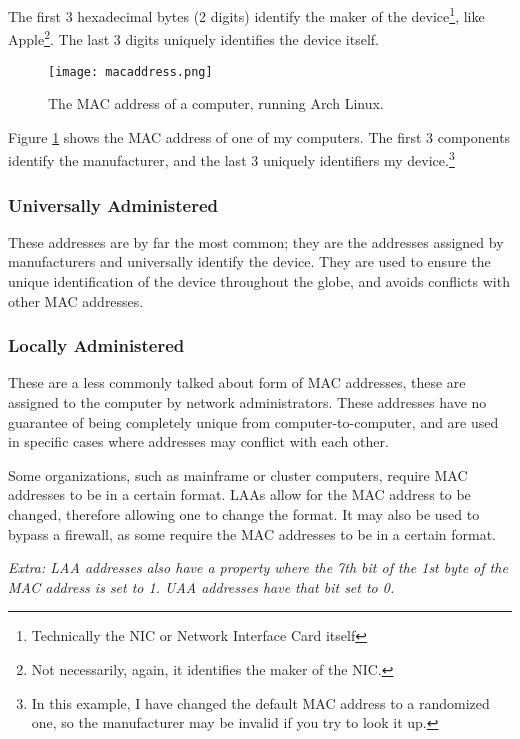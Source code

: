 \documentclass[../main.tex]{subfiles}
\begin{document}
The first 3 hexadecimal bytes (2 digits) identify the maker of the device\footnote{Technically the NIC or Network Interface Card itself}, like Apple\footnote{Not necessarily, again, it identifies the maker of the NIC.}. The last 3 digits uniquely identifies the device itself.

\begin{figure}[h]
    \centering
    \texttt{[image: macaddress.png]}
    \caption{The MAC address of a computer, running Arch Linux.}
    \label{fig:macaddress}
\end{figure}

Figure \ref{fig:macaddress} shows the MAC address of one of my computers. The first 3 components identify the manufacturer, and the last 3 uniquely identifiers my device.\footnote{In this example, I have changed the default MAC address to a randomized one, so the manufacturer may be invalid if you try to look it up.}

\subsubsection{Universally Administered}

These addresses are by far the most common; they are the addresses assigned by manufacturers and universally identify the device. They are used to ensure the unique identification of the device throughout the globe, and avoids conflicts with other MAC addresses.

\subsubsection{Locally Administered}

These are a less commonly talked about form of MAC addresses, these are assigned to the computer by network administrators. These addresses have no guarantee of being completely unique from computer-to-computer, and are used in specific cases where addresses may conflict with each other.

Some organizations, such as mainframe or cluster computers, require MAC addresses to be in a certain format. LAAs allow for the MAC address to be changed, therefore allowing one to change the format. It may also be used to bypass a firewall, as some require the MAC addresses to be in a certain format.

\emph{Extra: LAA addresses also have a property where the 7th bit of the 1st byte of the MAC address is set to 1. UAA addresses have that bit set to 0.}
\end{document}
